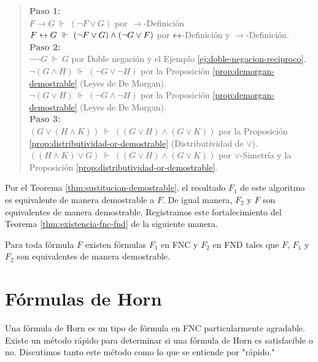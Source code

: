 \message{ !name(main.tex)}\documentclass[12pt,a4paper]{book}
\newcommand{\comillas}[1]{"#1"}
\begin{document}
    \begin{quote}
        \textbf{Paso 1:}\\[0.15cm]
        $F\rightarrow G\ \Vdash\ (\neg F\vee G)$ por $\rightarrow$-Definición\\
        $F\leftrightarrow G\ \Vdash\ (\neg F\vee G)\wedge(\neg G\vee F)$ por $\leftrightarrow$-Definición y $\rightarrow$-Definición.\\[0.3cm]
        \textbf{Paso 2:}\\[0.15cm]
        $\neg\neg G\ \Vdash\ G$ por Doble negación y el Ejemplo \ref{ej:doble-negacion-reciproco}.\\
        $\neg(G\wedge H)\ \Vdash\ (\neg G\vee\neg H)$ por la Proposición \ref{prop:demorgan-demostrable} (Leyes de De
        Morgan).\\
        $\neg(G\vee H)\ \Vdash\ (\neg G\wedge\neg H)$ por la Proposición \ref{prop:demorgan-demostrable} (Leyes de De
        Morgan).\\[0.3cm]
        \textbf{Paso 3:}\\[0.15cm]
        $(G\vee(H\wedge K))\ \Vdash\ ((G\vee H)\wedge(G\vee K))$ por la Proposición
        \ref{prop:distributividad-or-demostrable} (Distributividad de $\vee$).\\
        $((H\wedge K)\vee G)\ \Vdash\ ((G\vee H)\wedge(G\vee K))$ por $\vee$-Simetría y la Proposición
        \ref{prop:distributividad-or-demostrable}.
    \end{quote}

    Por el Teorema \ref{thm:sustitucion-demostrable}, el resultado $F_{1}$ de este algoritmo es equivalente de manera
    demostrable a $F$. De igual manera, $F_{2}$ y $F$ son equivalentes de manera demostrable. Registramos este
    fortalecimiento del Teorema \ref{thm:existencia-fnc-fnd} de la siguiente manera.

    \begin{proposicion}\label{prop:fnc-fnd-demostrable}
        Para toda fórmula $F$ existen fórmulas $F_{1}$ en FNC y $F_{2}$ en FND tales que $F$, $F_{1}$ y $F_{2}$ son
        equivalentes de manera demostrable.
    \end{proposicion}

    \section{Fórmulas de Horn}

    Una fórmula de Horn es un tipo de fórmula en FNC particularmente agradable. Existe un método rápido para determinar si
    una fórmula de Horn es satisfacible o no. Discutimos tanto este método como lo que se entiende por \comillas{rápido.}
\end{document}
